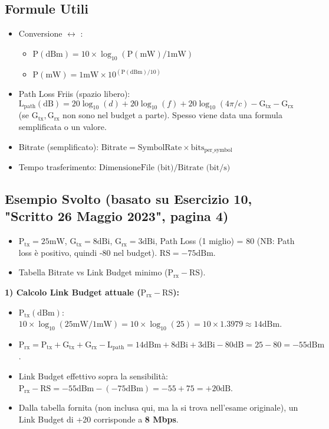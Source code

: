\subsection{Formule Utili}
\begin{itemize}
    \item Conversione  $\leftrightarrow$ :
    \begin{itemize}
        \item $\text{P}(\text{dBm}) = 10 \times \log_{10}( \text{P}(\text{mW}) / 1\text{mW} )$
        \item $\text{P}(\text{mW}) = 1\text{mW} \times 10^{( \text{P}(\text{dBm}) / 10 )}$
    \end{itemize}
    \item Path Loss Friis (spazio libero): $\text{L}_{\text{path}}(\text{dB}) = 20\log_{10}(d) + 20\log_{10}(f) + 20\log_{10}(4\pi/c) - \text{G}_{\text{tx}} - \text{G}_{\text{rx}}$ (se $\text{G}_{\text{tx}}, \text{G}_{\text{rx}}$ non sono nel budget a parte). Spesso viene data una formula semplificata o un valore.
    \item Bitrate (semplificato): $\text{Bitrate} = \text{SymbolRate} \times \text{bits}_{\text{per\_symbol}}$
    \item Tempo trasferimento: $\text{DimensioneFile (bit)} / \text{Bitrate (bit/s)}$
\end{itemize}

\subsection{Esempio Svolto (basato su Esercizio 10, "Scritto 26 Maggio 2023", pagina 4)}
\begin{itemize}
    \item $\text{P}_{\text{tx}} = 25\text{mW}$, $\text{G}_{\text{tx}} = 8\text{dBi}$, $\text{G}_{\text{rx}} = 3\text{dBi}$, Path Loss (1 miglio) = 80 (NB: Path loss è positivo, quindi -80 nel budget). $\text{RS} = -75\text{dBm}$.
    \item Tabella Bitrate vs Link Budget minimo ($\text{P}_{\text{rx}} - \text{RS}$).
\end{itemize}

\textbf{1) Calcolo Link Budget attuale ($\text{P}_{\text{rx}} - \text{RS}$):}
\begin{itemize}
    \item $\text{P}_{\text{tx}} (\text{dBm})$: $10 \times \log_{10}(25\text{mW} / 1\text{mW}) = 10 \times \log_{10}(25) = 10 \times 1.3979 \approx 14\text{dBm}$.
    \item $\text{P}_{\text{rx}} = \text{P}_{\text{tx}} + \text{G}_{\text{tx}} + \text{G}_{\text{rx}} - \text{L}_{\text{path}} = 14\text{dBm} + 8\text{dBi} + 3\text{dBi} - 80\text{dB} = 25 - 80 = -55\text{dBm}$.
    \item Link Budget effettivo sopra la sensibilità: $\text{P}_{\text{rx}} - \text{RS} = -55\text{dBm} - (-75\text{dBm}) = -55 + 75 = +20\text{dB}$.
    \item Dalla tabella fornita (non inclusa qui, ma la si trova nell'esame originale), un Link Budget di +20 corrisponde a \textbf{8 Mbps}.
\end{itemize}

